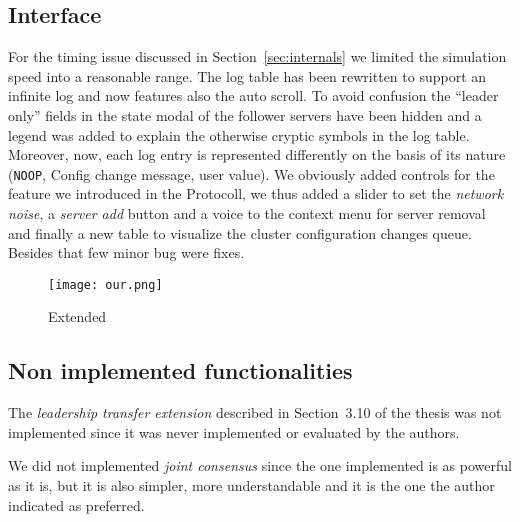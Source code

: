 \subsection{Interface}
For the timing issue discussed in Section~\ref{sec:internals} we limited the
simulation speed into a reasonable range.
The log table has been rewritten to support an infinite log and
now features also the auto scroll.
To avoid confusion the ``leader only'' fields in the state modal of the
follower servers have been hidden and a legend was added to explain the
otherwise cryptic symbols in the log table. Moreover, now, each log entry
is represented differently on the basis of its nature (\texttt{NOOP}, Config
change message, user value).
We obviously added controls for the feature we introduced in the Protocoll,
we thus added a slider to set the \emph{network noise}, a \emph{server add}
button and a voice to the context menu for server removal and finally
a new table to visualize the cluster configuration changes queue.
Besides that few minor bug were fixes.

\begin{figure*}[h]
    \centering
    \texttt{[image: our.png]}
    \caption{Extended}\label{fig:final}
\end{figure*}

\subsection{Non implemented functionalities}
The \emph{leadership transfer extension} described in Section~3.10 of the thesis
was not implemented since it was never implemented or evaluated by the authors.

We did not implemented \emph{joint consensus} since the one implemented is as
powerful as it is, but it is also simpler, more understandable and it is
the one the author indicated as preferred.

